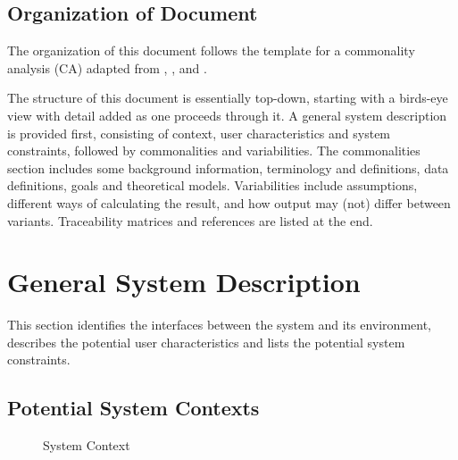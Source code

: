 \documentclass[12pt]{article}
\newcommand{\famname}{rkf45 Generator} %
\begin{document}
\subsection{Organization of Document}
The organization of this document follows the template for a commonality 
analysis (CA)   adapted from 
\cite{Lai2004}, \cite{SmithAndLai2005}, \cite{Smith2006} and 
\cite{SmithEtAl2007}.

The structure of this document is essentially top-down, starting with a 
birds-eye view with detail added as 
one proceeds through it. A general system description is provided first, 
consisting of context, user characteristics and system constraints,
followed by commonalities and variabilities. The commonalities section includes 
some background information, terminology and definitions, data definitions, 
goals and theoretical models. Variabilities include assumptions, different ways 
of calculating the result, and how output may (not) differ between variants.
Traceability matrices and references are listed at the end.

\section{General System Description}

This section identifies the interfaces between the system and its environment,
describes the potential user characteristics and lists the potential system
constraints.

\subsection{Potential System Contexts}

\begin{figure}[htb]
    \centering
{}
\caption{System Context}
\label{fig:systemcontext}
\end{figure}
\end{document}
